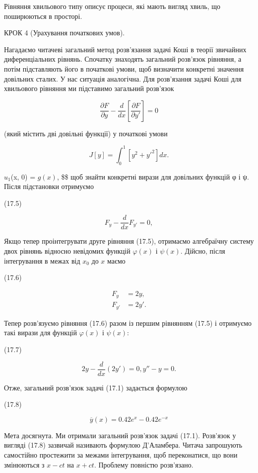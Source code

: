 \documentclass[
  ukrainian,
]{article}
\begin{document}
Рівняння хвильового типу описує процеси, які мають вигляд хвиль, що
поширюються в просторі.

КРОК 4 (Урахування початкових умов).

Нагадаємо читачеві загальний метод розв'язання задачі Коші в теорії
звичайних диференціальних рівнянь. Спочатку знаходять загальний
розв'язок рівняння, а потім підставляють його в початкові умови, щоб
визначити конкретні значення довільних сталих. У нас ситуація
аналогічна. Для розв'язання задачі Коші для хвильового рівняння ми
підставимо загальний розв'язок

\[
\frac{\partial F}{\partial y} - \frac{d}{dx} \left[ \frac{\partial F}{\partial y'} \right] = 0
\]

(який містить дві довільні функції) у початкові умови

\[
J[y] = \int_{0}^{1} [y^{2} + y'^{2}] dx.
\]

\(u_1\)(x, 0) = \(g(x)\), \$\$ щоб знайти конкретні вирази для довільних
функцій φ і ψ. Після підстановки отримуємо

(17.5)

\[
F_y - \frac{d}{dx} F_{y'} = 0,
\]

Якщо тепер проінтегрувати друге рівняння (17.5), отримаємо алгебраїчну
систему двох рівнянь відносно невідомих функцій \(\varphi(x)\) і
\(\psi(x)\). Дійсно, після інтегрування в межах від \(x_0\) до \(x\)
маємо

(17.6)

\[
\begin{aligned}
F_y &= 2y, \\
F_{y'} &= 2y'.
\end{aligned}
\]

Тепер розв'язуємо рівняння (17.6) разом із першим рівнянням (17.5) і
отримуємо такі вирази для функцій \(\varphi(x)\) і \(\psi(x)\):

(17.7)

\[
2y - \frac{d}{dx}(2y') = 0,
y'' - y = 0.
\]

Отже, загальний розв'язок задачі (17.1) задається формулою

(17.8)

\[
\overline{y}(x) = 0.42e^x - 0.42e^{-x}
\]

Мета досягнута. Ми отримали загальний розв'язок задачі (17.1). Розв'язок
у вигляді (17.8) зазвичай називають формулою Д'Аламбера. Читача
запрошують самостійно простежити за межами інтегрування, щоб
переконатися, що вони змінюються з \(x-ct\) на \(x+ct\). Проблему
повністю розв'язано.
\end{document}
